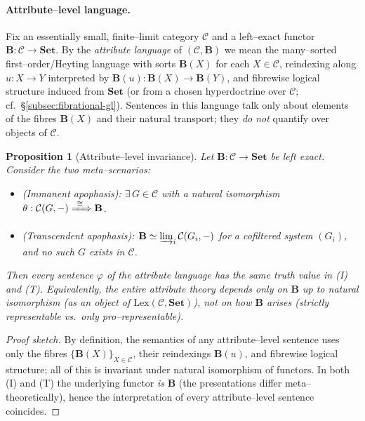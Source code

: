 \documentclass[11pt]{article}
\theoremstyle{upright}
\newtheorem{proposition}{Proposition}
\begin{document}
\paragraph{Attribute–level language.}
Fix an essentially small, finite–limit category $\mathcal C$ and a left–exact functor $\mathbf B:\mathcal C\to\mathbf{Set}$. By the \emph{attribute language} of $(\mathcal C,\mathbf B)$ we mean the many–sorted first–order/Heyting language with sorts $\mathbf B(X)$ for each $X\in\mathcal C$, reindexing along $u:X\to Y$ interpreted by $\mathbf B(u):\mathbf B(X)\to\mathbf B(Y)$, and fibrewise logical structure induced from $\mathbf{Set}$ (or from a chosen hyperdoctrine over $\mathcal C$; cf.\ \S\ref{subsec:fibrational-gl}). Sentences in this language talk only about elements of the fibres $\mathbf B(X)$ and their natural transport; they \emph{do not} quantify over objects of $\mathcal C$.

\begin{proposition}[Attribute–level invariance]\label{prop:attribute-invariance}
Let $\mathbf B:\mathcal C\to\mathbf{Set}$ be left exact. Consider the two meta–scenarios:
\begin{itemize}[leftmargin=2em]
\item[\textnormal{(I)}] \textnormal{(Immanent apophasis)}: $\exists\,G\in\mathcal C$ with a natural isomorphism $\theta:\mathcal C(G,-)\xRightarrow{\ \cong\ }\mathbf B$.
\item[\textnormal{(T)}] \textnormal{(Transcendent apophasis)}: $\mathbf B\simeq \varinjlim_{i}\mathcal C(G_i,-)$ for a cofiltered system $(G_i)$, and no such $G$ exists in $\mathcal C$.
\end{itemize}
Then every sentence $\varphi$ of the attribute language has the same truth value in \textnormal{(I)} and \textnormal{(T)}. Equivalently, the entire attribute theory depends only on $\mathbf B$ up to natural isomorphism (as an object of $\mathrm{Lex}(\mathcal C,\mathbf{Set})$), not on how $\mathbf B$ arises (strictly representable vs.\ only pro–representable).
\end{proposition}

\begin{proof}[Proof sketch]
By definition, the semantics of any attribute–level sentence uses only the fibres $\{\mathbf B(X)\}_{X\in\mathcal C}$, their reindexings $\mathbf B(u)$, and fibrewise logical structure; all of this is invariant under natural isomorphism of functors. In both \textnormal{(I)} and \textnormal{(T)} the underlying functor \emph{is} $\mathbf B$ (the presentations differ meta–theoretically), hence the interpretation of every attribute–level sentence coincides.
\end{proof}
\end{document}
